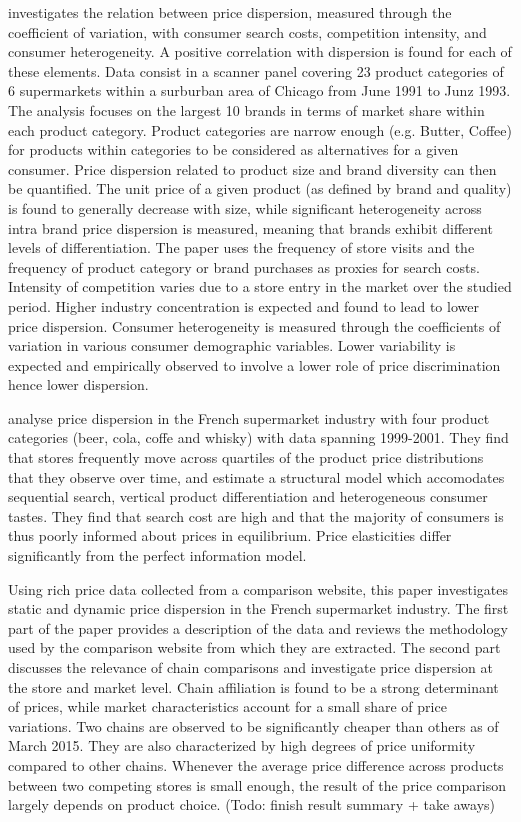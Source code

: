 \documentclass[english]{article}
\begin{document}
\cite{ZHA06} investigates the relation between price dispersion, measured through the coefficient of variation, with consumer search costs, competition intensity, and consumer heterogeneity. A positive correlation with dispersion is found for each of these elements. Data consist in a scanner panel covering 23 product categories of 6 supermarkets within a surburban area of Chicago from June 1991 to Junz 1993. The analysis focuses on the largest 10 brands in terms of market share within each product category. Product categories are narrow enough (e.g. Butter, Coffee) for products within categories to be considered as alternatives for a given consumer. Price dispersion related to product size and brand diversity can then be quantified. The unit price of a given product (as defined by brand and quality) is found to generally decrease with size, while significant heterogeneity across intra brand price dispersion is measured, meaning that brands exhibit different levels of differentiation. The paper uses the frequency of store visits and the frequency of product category or brand purchases as proxies for search costs. Intensity of competition varies due to a store entry in the market over the studied period. Higher industry concentration is expected and found to lead to lower price dispersion. Consumer heterogeneity is measured through the coefficients of variation in various consumer demographic variables. Lower variability is expected and empirically observed to involve a lower role of price discrimination hence lower dispersion.

\cite{PER15} analyse price dispersion in the French supermarket industry with four product categories (beer, cola, coffe and whisky) with data spanning 1999-2001. They find that stores frequently move across quartiles of the product price distributions that they observe over time, and estimate a structural model which accomodates sequential search, vertical product differentiation and heterogeneous consumer tastes. They find that search cost are high and that the majority of consumers is thus poorly informed about prices in equilibrium. Price elasticities differ significantly from the perfect information model.

Using rich price data collected from a comparison website, this paper investigates static and dynamic price dispersion in the French supermarket industry. The first part of the paper provides a description of the data and reviews the methodology used by the comparison website from which they are extracted. The second part discusses the relevance of chain comparisons and investigate price dispersion at the store and market level. Chain affiliation is found to be a strong determinant of prices, while market characteristics account for a small share of price variations. Two chains are observed to be significantly cheaper than others as of March 2015. They are also characterized by high degrees of price uniformity compared to other chains. Whenever the average price difference across products between two competing stores is small enough, the result of the price comparison largely depends on product choice. (Todo: finish result summary + take aways)
\end{document}
